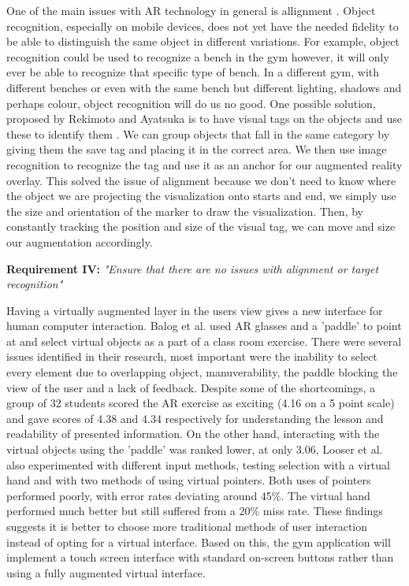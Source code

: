 \documentclass{l4proj}
\begin{document}
One of the main issues with AR technology in general is allignment \cite{sood_pro_2012}. Object recognition, especially on mobile devices, does not yet have the needed fidelity to be able to distinguish the same object in different variations. For example, object recognition could be used to recognize a bench in the gym however, it will only ever be able to recognize that specific type of bench. In a different gym, with different benches or even with the same bench but different lighting, shadows and perhaps colour, object recognition will do us no good. One possible solution, proposed by Rekimoto and Ayatsuka is to have visual tags on the objects and use these to identify them \cite{rekimoto_cybercode:_2000}. We can group objects that fall in the same category by giving them the save tag and placing it in the correct area. We then use image recognition to recognize the tag and use it as an anchor for our augmented reality overlay. This solved the issue of alignment because we don't need to know where the object we are projecting the visualization onto starts and end, we simply use the size and orientation of the marker to draw the visualization. Then, by constantly tracking the position and size of the visual tag, we can move and size our augmentation accordingly.

\textbf{Requirement IV:} \textit{"Ensure that there are no issues with alignment or target recognition"}  

Having a virtually augmented layer in the users view gives a new interface for human computer interaction. Balog et al. used AR glasses and a 'paddle' to point at and select virtual objects as a part of a class room exercise. There were several issues identified in their research, most important were the inability to select every element due to overlapping object, manuverability, the paddle blocking the view of the user and a lack of feedback\cite{balog_augmented_2007}. Despite some of the shortcomings, a group of 32 students scored the AR exercise as exciting (4.16 on a 5 point scale) and gave scores of 4.38 and 4.34 respectively for understanding the lesson and readability of presented information\cite{looser_evaluation_2007}. On the other hand, interacting with the virtual objects using the 'paddle' was ranked lower, at only 3.06\cite{balog_augmented_2007}, Looser et al. also experimented with different input methods, testing selection with a virtual hand and with two methods of using virtual pointers\cite{looser_evaluation_2007}. Both uses of pointers performed poorly, with error rates deviating around 45\%\cite{looser_evaluation_2007}. The virtual hand performed much better but still suffered from a 20\% miss rate\cite{looser_evaluation_2007}. These findings suggests it is better to choose  more traditional methods of user interaction instead of opting for a virtual interface. Based on this, the gym application will implement a touch screen interface with standard on-screen buttons rather than using a fully augmented virtual interface. 
\end{document}
